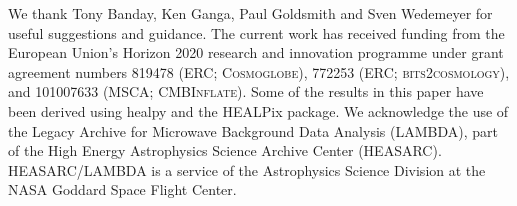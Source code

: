 \documentclass{aa}
\begin{document}
\begin{acknowledgements}
  We thank Tony Banday, Ken Ganga, Paul Goldsmith and Sven Wedemeyer
  for useful suggestions and guidance.  The current work has received
  funding from the European Union’s Horizon 2020 research and
  innovation programme under grant agreement numbers 819478 (ERC;
  \textsc{Cosmoglobe}), 772253 (ERC; \textsc{bits2cosmology}), and
  101007633 (MSCA; \textsc{CMBInflate}). Some of the results in this
  paper have been derived using healpy \citep{Zonca2019} and the
  HEALPix \citep{healpix} package.  We acknowledge the use of the
  Legacy Archive for Microwave Background Data Analysis (LAMBDA), part
  of the High Energy Astrophysics Science Archive Center
  (HEASARC). HEASARC/LAMBDA is a service of the Astrophysics Science
  Division at the NASA Goddard Space Flight Center.
\end{acknowledgements}


%



\end{document}
